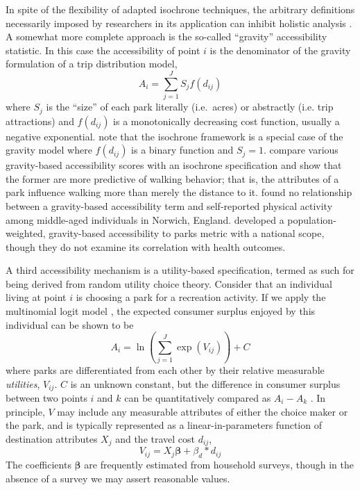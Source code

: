 \documentclass[Crown,sageh.bst]{sagej}
\begin{document}
In spite of the flexibility of adapted isochrone techniques, the
arbitrary definitions necessarily imposed by researchers in its
application can inhibit holistic analysis \citep{Logan2017}. A somewhat
more complete approach is the so-called ``gravity'' accessibility
statistic. In this case the accessibility of point \(i\) is the
denominator of the gravity formulation of a trip distribution model,
\begin{equation}\label{eq:gravity}
A_i = \sum_{j = 1}^J S_j f(d_{ij})
\end{equation} where \(S_j\) is the ``size'' of each park literally
(i.e.~acres) or abstractly (i.e. trip attractions) and \(f(d_{ij})\) is
a monotonically decreasing cost function, usually a negative
exponential. \citet{Dong2006} note that the isochrone framework is a
special case of the gravity model where \(f(d_{ij})\) is a binary
function and \(S_j = 1\). \citet{Giles-Corti2005} compare various
gravity-based accessibility scores with an isochrone specification and
show that the former are more predictive of walking behavior; that is,
the attributes of a park influence walking more than merely the distance
to it. \citet{hillsdon2006relationship} found no relationship between a
gravity-based accessibility term and self-reported physical activity
among middle-aged individuals in Norwich, England. \citet{Zhang2011}
developed a population-weighted, gravity-based accessibility to parks
metric with a national scope, though they do not examine its correlation
with health outcomes.

A third accessibility mechanism is a utility-based specification, termed
as such for being derived from random utility choice theory. Consider
that an individual living at point \(i\) is choosing a park for a
recreation activity. If we apply the multinomial logit model
\citep{McFadden1974}, the expected consumer surplus enjoyed by this
individual can be shown to be \begin{equation}\label{eq:utility}
A_i = \ln\left({\sum_{j = 1}^J\exp(V_{ij})}\right) + C
\end{equation} where parks are differentiated from each other by their
relative measurable \emph{utilities}, \(V_{ij}\). \(C\) is an unknown
constant, but the difference in consumer surplus between two points
\(i\) and \(k\) can be quantitatively compared as \(A_i - A_k\)
\citep{Bruce1977}. In principle, \(V\) may include any measurable
attributes of either the choice maker or the park, and is typically
represented as a linear-in-parameters function of destination attributes
\(X_j\) and the travel cost \(d_{ij}\),
\begin{equation}\label{eq:utilityV}
V_{ij} = X_j\boldsymbol{\beta} + \beta_d * d_{ij}
\end{equation} The coefficients \(\boldsymbol{\beta}\) are frequently
estimated from household surveys, though in the absence of a survey we
may assert reasonable values.
\end{document}
